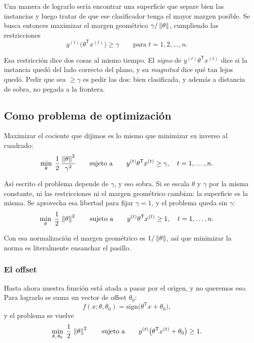 \documentclass[11pt,letterpaper]{article}
\begin{document}
Una manera de lograrlo sería encontrar una superficie que separe bien
las instancias y luego tratar de que ese clasificador tenga el mayor
margen posible. Se busca entonces maximizar el margen geométrico
$\gamma / \left\lVert \theta \right\rVert$, cumpliendo las restricciones
\[
    y^{(t)} \big(\theta^{\mathsf{T}} x^{(t)}\big) \geq \gamma
    \qquad \text{para } t = 1, 2, \ldots, n .
\]

\begin{idea}
  Esa restricción dice dos cosas al mismo tiempo. El \emph{signo} de
  $y^{(t)}\theta^{\mathsf{T}}x^{(t)}$ dice si la instancia quedó del
  lado correcto del plano, y su \emph{magnitud} dice qué tan lejos
  quedó. Pedir que sea $\geq \gamma$ es pedir las dos: bien
  clasificada, y además a distancia de sobra, no pegada a la
  frontera.
\end{idea}


\subsection*{Como problema de optimización}

Maximizar el cociente que dijimos es lo mismo que minimizar su
inverso al cuadrado:
\[
    \min_{\theta} \; \frac{1}{2}\,
    \frac{\left\lVert \theta \right\rVert^{2}}{\gamma^{2}}
    \qquad \text{sujeto a} \qquad
    y^{(t)} \theta^{\mathsf{T}} x^{(t)} \geq \gamma ,
    \quad t = 1, \ldots, n .
\]

Así escrito el problema depende de $\gamma$, y eso sobra. Si se
escala $\theta$ y $\gamma$ por la misma constante, ni las
restricciones ni el margen geométrico cambian: la superficie es la
misma. Se aprovecha esa libertad para fijar $\gamma = 1$, y el
problema queda sin $\gamma$:
\[
    \min_{\theta} \; \frac{1}{2}\,\left\lVert \theta \right\rVert^{2}
    \qquad \text{sujeto a} \qquad
    y^{(t)} \theta^{\mathsf{T}} x^{(t)} \geq 1 ,
    \quad t = 1, \ldots, n .
\]

Con esa normalización el margen geométrico es $1 / \left\lVert \theta \right\rVert$,
así que minimizar la norma es literalmente ensanchar el pasillo.

\subsubsection*{El offset}

Hasta ahora nuestra función está atada a pasar por el origen, y no
queremos eso. Para lograrlo se suma un vector de offset $\theta_0$:
\[
    f(x; \theta, \theta_0) =
    \mathrm{sign}\big(\theta^{\mathsf{T}} x + \theta_0\big) ,
\]
y el problema se vuelve
\[
    \min_{\theta,\,\theta_0} \; \frac{1}{2}\,\left\lVert \theta \right\rVert^{2}
    \qquad \text{sujeto a} \qquad
    y^{(t)} \big(\theta^{\mathsf{T}} x^{(t)} + \theta_0\big) \geq 1 .
\]
\end{document}
